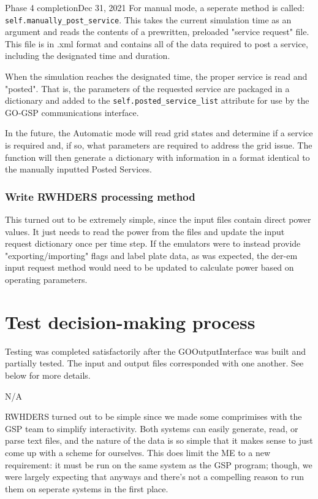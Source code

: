 \begin{entry}{Phase 4 completion}{Dec 31, 2021}
    For manual mode, a seperate method is called: \verb|self.manually_post_service|. This takes the current simulation
    time as an argument and reads the contents of a prewritten, preloaded "service request" file. This file is in .xml
    format and contains all of the data required to post a service, including the designated time and duration.

    When the simulation reaches the designated time, the proper service is read and "posted". That is, the parameters of
    the requested service are packaged in a dictionary and added to the \verb|self.posted_service_list| attribute for
    use by the GO-GSP communications interface.

    In the future, the Automatic mode will read grid states and determine if a service is required and, if so, what
    parameters are required to address the grid issue. The function will then generate a dictionary with information in
    a format identical to the manually inputted Posted Services.

    \subsubsection*{Write RWHDERS processing method}
    This turned out to be extremely simple, since the input files contain direct power values. It just needs to read the
    power from the files and update the input request dictionary once per time step. If the emulators were to instead
    provide "exporting/importing" flags and label plate data, as was expected, the der-em input request method would
    need to be updated to calculate power based on operating parameters.


    \section*{Test decision-making process}
    Testing was completed satisfactorily after the GOOutputInterface was built and partially tested. The input and output
    files corresponded with one another. See below for more details.

    \parameters
    
    N/A

    \observations

    RWHDERS turned out to be simple since we made some comprimises with the GSP team to simplify interactivity. Both
    systems can easily generate, read, or parse text files, and the nature of the data is so simple that it makes sense
    to just come up with a scheme for ourselves. This does limit the ME to a new requirement: it must be run on the
    same system as the GSP program; though, we were largely expecting that anyways and there's not a compelling reason
    to run them on seperate systems in the first place.



\end{entry}
